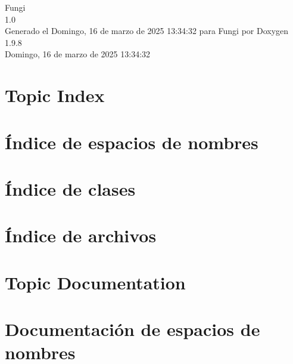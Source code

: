 \documentclass[twoside]{book}
\newcommand{\+}{\discretionary{\mbox{\scriptsize$\hookleftarrow$}}{}{}}
\newcommand{\clearemptydoublepage}{%
    \newpage{\pagestyle{empty}\cleardoublepage}%
  }
\begin{document}
  \raggedbottom
    \hypersetup{pageanchor=false,
                bookmarksnumbered=true,
                pdfencoding=unicode
               }
  \begin{titlepage}
  \vspace*{7cm}
  \begin{center}%
  {\Large Fungi}\\
  [1ex]\large 1.\+0 \\
  \vspace*{1cm}
  {\large Generado el Domingo, 16 de marzo de 2025 13\+:34\+:32 para Fungi por Doxygen 1.9.8}\\
    \vspace*{0.5cm}
    {\small Domingo, 16 de marzo de 2025 13:34:32}
  \end{center}
  \end{titlepage}
  \clearemptydoublepage
  \tableofcontents
  \clearemptydoublepage
  \hypersetup{pageanchor=true}

\chapter{Topic Index}

\chapter{Índice de espacios de nombres}

\chapter{Índice de clases}

\chapter{Índice de archivos}

\chapter{Topic Documentation}

\chapter{Documentación de espacios de nombres}




\end{document}
